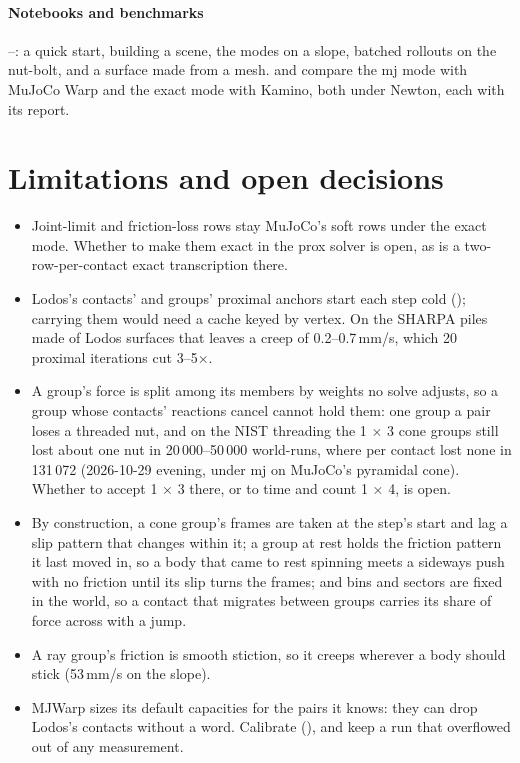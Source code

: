 \paragraph{Notebooks and benchmarks} --: a quick start, building a scene, the modes on a slope, batched rollouts on the nut-bolt, and a surface made from a mesh.  and  compare the mj mode with MuJoCo Warp and the exact mode with Kamino, both under Newton, each with its report.

\section{Limitations and open decisions}\label{sec:limits}

\begin{itemize}
\item Joint-limit and friction-loss rows stay MuJoCo's soft rows under the exact mode. Whether to make them exact in the prox solver is open, as is a two-row-per-contact exact transcription there.
\item Lodos's contacts' and groups' proximal anchors start each step cold (); carrying them would need a cache keyed by vertex. On the SHARPA piles made of Lodos surfaces that leaves a creep of 0.2--0.7\,mm/s, which 20 proximal iterations cut 3--5$\times$.
\item A group's force is split among its members by weights no solve adjusts, so a group whose contacts' reactions cancel cannot hold them: one group a pair loses a threaded nut, and on the NIST threading the 1 $\times$ 3 cone groups still lost about one nut in 20\,000--50\,000 world-runs, where per contact lost none in 131\,072 (2026-10-29 evening, under mj on MuJoCo's pyramidal cone). Whether to accept 1 $\times$ 3 there, or to time and count 1 $\times$ 4, is open.
\item By construction, a cone group's frames are taken at the step's start and lag a slip pattern that changes within it; a group at rest holds the friction pattern it last moved in, so a body that came to rest spinning meets a sideways push with no friction until its slip turns the frames; and bins and sectors are fixed in the world, so a contact that migrates between groups carries its share of force across with a jump.
\item A ray group's friction is smooth stiction, so it creeps wherever a body should stick (53\,mm/s on the slope).
\item MJWarp sizes its default capacities for the pairs it knows: they can drop Lodos's contacts without a word. Calibrate (), and keep a run that overflowed out of any measurement.

\end{itemize}
